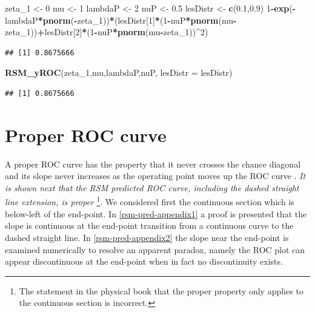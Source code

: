 \documentclass[
]{book}
\newenvironment{Shaded}{\begin{snugshade}}{\end{snugshade}}
\newcommand{\DataTypeTok}[1]{\textcolor[rgb]{0.13,0.29,0.53}{#1}}
\newcommand{\DecValTok}[1]{\textcolor[rgb]{0.00,0.00,0.81}{#1}}
\newcommand{\FloatTok}[1]{\textcolor[rgb]{0.00,0.00,0.81}{#1}}
\newcommand{\KeywordTok}[1]{\textcolor[rgb]{0.13,0.29,0.53}{\textbf{#1}}}
\newcommand{\NormalTok}[1]{#1}
\newcommand{\OperatorTok}[1]{\textcolor[rgb]{0.81,0.36,0.00}{\textbf{#1}}}
\newcommand{\StringTok}[1]{\textcolor[rgb]{0.31,0.60,0.02}{#1}}
\begin{document}
\begin{Shaded}
\begin{Highlighting}[]
\NormalTok{zeta_}\DecValTok{1}\NormalTok{ <-}\StringTok{ }\DecValTok{0}
\NormalTok{mu <-}\StringTok{ }\DecValTok{1}
\NormalTok{lambdaP <-}\StringTok{ }\DecValTok{2}
\NormalTok{nuP <-}\StringTok{ }\FloatTok{0.5}
\NormalTok{lesDistr <-}\StringTok{ }\KeywordTok{c}\NormalTok{(}\FloatTok{0.1}\NormalTok{,}\FloatTok{0.9}\NormalTok{)}
\DecValTok{1}\OperatorTok{-}\KeywordTok{exp}\NormalTok{(}\OperatorTok{-}\NormalTok{lambdaP}\OperatorTok{*}\KeywordTok{pnorm}\NormalTok{(}\OperatorTok{-}\NormalTok{zeta_}\DecValTok{1}\NormalTok{))}\OperatorTok{*}\NormalTok{(lesDistr[}\DecValTok{1}\NormalTok{]}\OperatorTok{*}\NormalTok{(}\DecValTok{1}\OperatorTok{-}\NormalTok{nuP}\OperatorTok{*}\KeywordTok{pnorm}\NormalTok{(mu}\OperatorTok{-}\NormalTok{zeta_}\DecValTok{1}\NormalTok{))}\OperatorTok{+}\NormalTok{lesDistr[}\DecValTok{2}\NormalTok{]}\OperatorTok{*}\NormalTok{(}\DecValTok{1}\OperatorTok{-}\NormalTok{nuP}\OperatorTok{*}\KeywordTok{pnorm}\NormalTok{(mu}\OperatorTok{-}\NormalTok{zeta_}\DecValTok{1}\NormalTok{))}\OperatorTok{^}\DecValTok{2}\NormalTok{)}
\end{Highlighting}
\end{Shaded}

\begin{verbatim}
## [1] 0.8675666
\end{verbatim}

\begin{Shaded}
\begin{Highlighting}[]
\KeywordTok{RSM_yROC}\NormalTok{(zeta_}\DecValTok{1}\NormalTok{,mu,lambdaP,nuP, }\DataTypeTok{lesDistr =}\NormalTok{ lesDistr)}
\end{Highlighting}
\end{Shaded}

\begin{verbatim}
## [1] 0.8675666
\end{verbatim}

\hypertarget{rsm-pred-roc-curve-proper}{%
\section{Proper ROC curve}\label{rsm-pred-roc-curve-proper}}

A proper ROC curve has the property that it never crosses the chance diagonal and its slope never increases as the operating point moves up the ROC curve \citep{metz1999proper, macmillan2004detection}. \emph{It is shown next that the RSM predicted ROC curve, including the dashed straight line extension, is proper} \footnote{The statement in the physical book that the proper property only applies to the continuous section is incorrect.}. We considered first the continuous section which is below-left of the end-point. In \ref{rsm-pred-appendix1} a proof is presented that the slope is continuous at the end-point transition from a continuous curve to the dashed straight line. In \ref{rsm-pred-appendix2} the slope near the end-point is examined numerically to resolve an apparent paradox, namely the ROC plot can appear discontinuous at the end-point when in fact no discontinuity exists.
\end{document}
